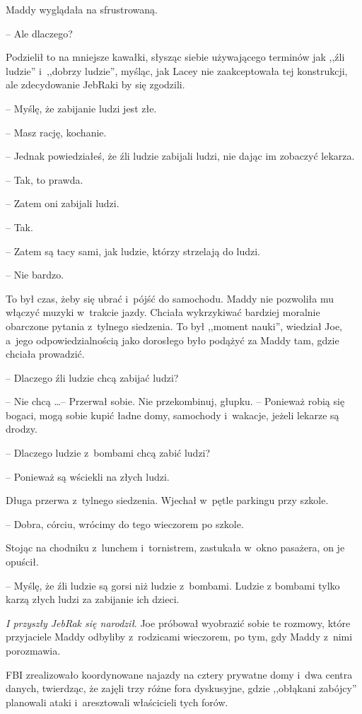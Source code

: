 \documentclass[oneside,polish,11pt,sfheadings]{mwbk}
\begin{document}
Maddy wyglądała na sfrustrowaną. 

-- Ale dlaczego?

Podzielił to na mniejsze kawałki, słysząc siebie używającego terminów
jak ,,źli ludzie'' i~,,dobrzy ludzie'', myśląc, jak Lacey nie
zaakceptowała tej konstrukcji, ale zdecydowanie JebRaki by się zgodzili.

-- Myślę, że zabijanie ludzi jest złe.

-- Masz rację, kochanie.

-- Jednak powiedziałeś, że źli ludzie zabijali ludzi, nie dając im
zobaczyć lekarza.

-- Tak, to prawda.

-- Zatem oni zabijali ludzi.

-- Tak.

-- Zatem są tacy sami, jak ludzie, którzy strzelają do ludzi.

-- Nie bardzo.

To był czas, żeby się ubrać i~pójść do samochodu. Maddy nie pozwoliła mu
włączyć muzyki w~trakcie jazdy. Chciała wykrzykiwać bardziej moralnie
obarczone pytania z~tylnego siedzenia. To był ,,moment nauki'', wiedział
Joe, a~jego odpowiedzialnością jako dorosłego było podążyć za Maddy tam,
gdzie chciała prowadzić.

-- Dlaczego źli ludzie chcą zabijać ludzi?

-- Nie chcą \ldots  -- Przerwał sobie. Nie przekombinuj, głupku. -- Ponieważ
robią się bogaci, mogą sobie kupić ładne domy, samochody i~wakacje,
jeżeli lekarze są drodzy.

-- Dlaczego ludzie z~bombami chcą zabić ludzi?

-- Ponieważ są wściekli na złych ludzi.

Długa przerwa z~tylnego siedzenia. Wjechał w~pętle parkingu przy szkole.

-- Dobra, córciu, wrócimy do tego wieczorem po szkole.

Stojąc na chodniku z~lunchem i~tornistrem, zastukała w~okno pasażera, on
je opuścił. 

-- Myślę, że źli ludzie są gorsi niż ludzie z~bombami. Ludzie
z bombami tylko karzą złych ludzi za zabijanie ich dzieci.

\textit{I przyszły JebRak się narodził}. Joe próbował wyobrazić sobie te
rozmowy, które przyjaciele Maddy odbyliby z~rodzicami wieczorem, po tym,
gdy Maddy z~nimi porozmawia.

FBI zrealizowało koordynowane najazdy na cztery prywatne domy i~dwa
centra danych, twierdząc, że zajęli trzy różne fora dyskusyjne, gdzie
,,obłąkani zabójcy'' planowali ataki i~aresztowali właścicieli tych
forów.
\end{document}
